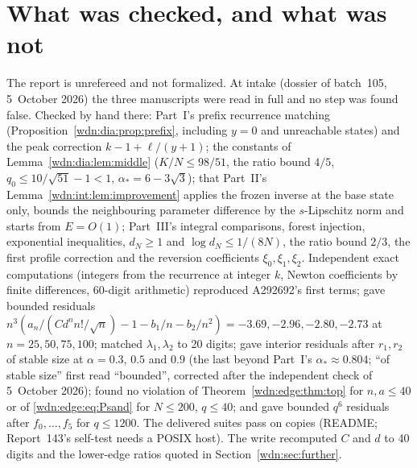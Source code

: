 \documentclass[11pt,letterpaper]{article}
\theoremstyle{remark}\newtheorem{remark}[theorem]{Remark}
\begin{document}
\section*{What was checked, and what was not}\label{wdn:sec:trust}
The report is unrefereed and not formalized. At intake (dossier of batch~105, 5~October 2026) the three manuscripts were read in full and no step was found false. Checked by hand there: Part~I's prefix recurrence matching (Proposition~\ref{wdn:dia:prop:prefix}, including $y=0$ and unreachable states) and the peak correction $k-1+\ell/(y+1)$; the constants of Lemma~\ref{wdn:dia:lem:middle} ($K/N\le98/51$, the ratio bound $4/5$, $q_0\le10/\sqrt{51}-1<1$, $\alpha_*=6-3\sqrt3$); that Part~II's Lemma~\ref{wdn:int:lem:improvement} applies the frozen inverse at the base state only, bounds the neighbouring parameter difference by the $s$-Lipschitz norm and starts from $E=O(1)$; Part~III's integral comparisons, forest injection, exponential inequalities, $d_N\ge1$ and $\log d_N\le1/(8N)$, the ratio bound $2/3$, the first profile correction and the reversion coefficients $\xi_0,\xi_1,\xi_2$. Independent exact computations (integers from the recurrence at integer $k$, Newton coefficients by finite differences, 60-digit arithmetic) reproduced A292692's first terms; gave bounded residuals $n^3(a_n/(Cd^nn!/\sqrt n)-1-b_1/n-b_2/n^2)=-3.69,-2.96,-2.80,-2.73$ at $n=25,50,75,100$; matched $\lambda_1,\lambda_2$ to 20 digits; gave interior residuals after $r_1,r_2$ of stable size at $\alpha=0.3$, $0.5$ and $0.9$ (the last beyond Part~I's $\alpha_*\approx0.804$; ``of stable size'' first read ``bounded'', corrected after the independent check of 5~October 2026); found no violation of Theorem~\ref{wdn:edge:thm:top} for $n,a\le40$ or of \eqref{wdn:edge:eq:Psand} for $N\le200$, $q\le40$; and gave bounded $q^6$ residuals after $f_0,\ldots,f_5$ for $q\le1200$. The delivered suites pass on copies (README; Report~143's self-test needs a POSIX host). The write recomputed $C$ and $d$ to 40 digits and the lower-edge ratios quoted in Section~\ref{wdn:sec:further}.
\end{document}
